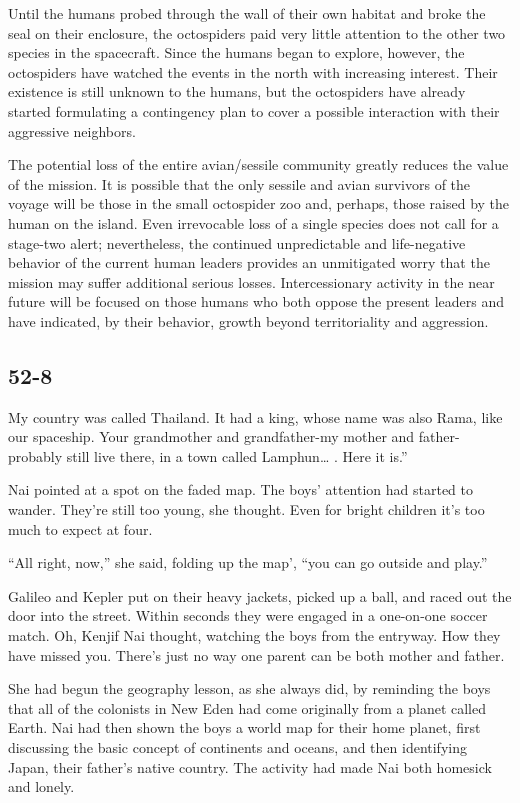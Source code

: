 \documentclass[]{article}
\begin{document}
{{Until the humans probed through the wall of their own habitat and broke the seal on their enclosure, the octospiders paid very little attention to the other two species in the spacecraft.  Since the humans began to explore, however, the octospiders have watched the events in the north with increasing interest.  Their existence is still unknown to the humans, but the octospiders have already started formulating a contingency plan to cover a possible interaction with their aggressive neighbors.

The potential loss of the entire avian/sessile community greatly reduces the value of the mission.  It is possible that the only sessile and avian survivors of the voyage will be those in the small octospider zoo and, perhaps, those raised by the human on the island.  Even irrevocable loss of a single species does not call for a stage-two alert; nevertheless, the continued unpredictable and life-negative behavior of the current human leaders provides an unmitigated worry that the mission may suffer additional serious losses.  Intercessionary activity in the near future will be focused on those humans who both oppose the present leaders and have indicated, by their behavior, growth beyond territoriality and aggression.


\subsection*{52-8}

My country was called Thailand.  It had a king, whose name was also Rama, like our spaceship.  Your grandmother and grandfather-my mother and father-probably still live there, in a town called Lamphun… .  Here it is.”

Nai pointed at a spot on the faded map.  The boys’ attention had started to wander.  They’re still too young, she thought.  Even for bright children it’s too much to expect at four.

“All right, now,” she said, folding up the map’, “you can go outside and play.”

Galileo and Kepler put on their heavy jackets, picked up a ball, and raced out the door into the street.  Within seconds they were engaged in a one-on-one soccer match.  Oh, Kenjif Nai thought, watching the boys from the entryway.  How they have missed you.  There’s just no way one parent can be both mother and father.

She had begun the geography lesson, as she always did, by reminding the boys that all of the colonists in New Eden had come originally from a planet called Earth.  Nai had then shown the boys a world map for their home planet, first discussing the basic concept of continents and oceans, and then identifying Japan, their father’s native country.  The activity had made Nai both homesick and lonely.

}}
\end{document}
